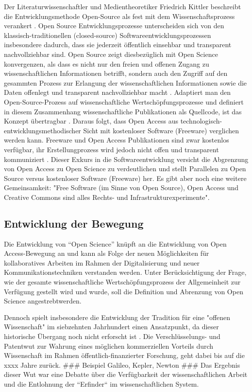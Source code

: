 Der Literaturwissenschaftler und Medientheoretiker Friedrich Kittler beschreibt die Entwicklungsmethode Open-Source als fest mit dem Wissenschaftsprozess verankert \cite{suchen}. Open Source Entwicklungsprozesse unterscheiden sich von den klassisch-traditionellen (closed-source) Softwareentwicklungsprozessen insbesondere dadurch, dass sie jederzeit öffentlich einsehbar und transparent nachvollziehbar sind. Open Source zeigt diesbezüglich mit Open Science konvergenzen, als dass es nicht nur den freien und offenen Zugang zu wissenschaftlichen Informationen betrifft, sondern auch den Zugriff auf den gesammten Prozess zur Erlangung der wissenschaftlichen Informationen sowie die Daten offenlegt und transparent nachvollziehbar macht \cite{kelty_2004}. Adaptiert man den Open-Source-Prozess auf wissenschaftliche Wertschöpfungsprozesse und definiert in diesem Zusammenhang wissenschaftliche Publikationen als Quellcode, ist das Konzept übertragbar \cite{Singh_2008} \cite{Bradley_2008} \cite{Bradley_2007}. Daraus folgt, dass Open Access aus technologisch-entwicklungsmethodischer Sicht mit kostenloser Software (Freeware) \cite{suchen} verglichen werden kann. Freeware und Open Access Publikationen sind zwar kostenlos verfügbar, ihr Erstellungprozess wird jedoch nicht offen und transparent kommuniziert \cite{suchen}. Dieser Exkurs in die Softwareentwicklung versicht die Abgrenzung von Open Access zu Open Science zu verdeutlichen und stellt Parallelen zu Open Source versus kostenloser Software (Freeware) her. Es gibt aber noch eine  weitere Gemeinsamkeit: "Free Software (im Sinne von Open Source), Open Access und Creative Commons sind alles Rechts- und Infrastrukturexperimente"\cite{kelty_2004}.

\subsection{Entwicklung der Bewegung}

Die Entwicklung von “Open Science” knüpft an die Entwicklung von Open Access-Bewegung an und kann als Folge der neuen Möglichkeiten für kollaboratives Arbeiten im Rahmen der Digitalisierung und neuer Kommunikationstechniken verstanden werden. Unter Berücksichtigung der Frage, wie der gesamte wissenschaftliche Wertschöpfungsprozess der Allgemeinheit zur Verfügung gestellt wird und wurde, soll die Definition und Abrenzung von Open Science angestrebtwerden. 

Dennoch spielt insbesondere die Entwicklung der Tradition für eine "offenen Wissenschaft" im siebzehnten Jahrhundert einen Ansatzpunkt, da dieser historische Übergang noch nicht erforscht ist \cite{CREATe_2014}. Die Verschlüsselungs- und Patentwut zur Wahrung eines möglichen kommerziellen Vorteils durch Wissenschaft im Rahmen öffentlich-finanzierter Forschung, geht dabei bis auf die xxxx Jahre zurück. ### Beispiel Galileo, Kepler, Newton ### Das Ergebnis dieser Wut war eine Debatte über die Verfügbarkeit der wissenschaftlichen Arbeit und die Entlohnung der “Erfinder“ im wissenschaftlichen System. 


